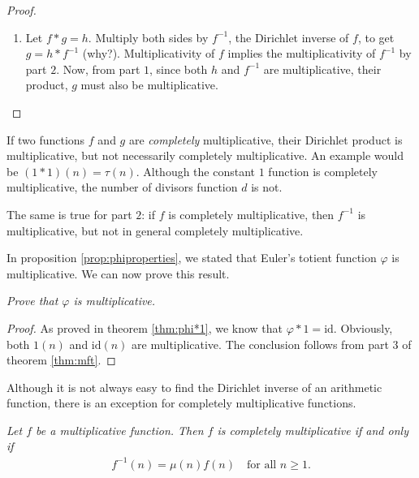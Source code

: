 \documentclass[12pt]{subfile}
\begin{document}
\begin{proof}
\begin{enumerate}
				\item Let $f\ast g=h$. Multiply both sides by $f^{-1}$, the Dirichlet inverse of $f$, to get $g = h \ast f^{-1}$ (why?). Multiplicativity of $f$ implies the multiplicativity of $f^{-1}$ by part $2$. Now, from part $1$, since both $h$ and $f^{-1}$ are multiplicative, their product, $g$ must also be multiplicative.
			\end{enumerate}
		\end{proof}
		
		\begin{note}
			If two functions $f$ and $g$ are \textit{completely} multiplicative, their Dirichlet product is multiplicative, but not necessarily completely multiplicative. An example would be $(1 \ast 1)(n) = \tau(n)$. Although the constant $1$ function is completely multiplicative, the number of divisors function $d$ is not.
			
			The same is true for part $2$: if $f$ is completely multiplicative, then $f^{-1}$ is multiplicative, but not in general completely multiplicative.
		\end{note}
	
	In proposition \eqref{prop:phiproperties}, we stated that Euler's totient function $\varphi$ is multiplicative. We can now prove this result.
	
		\begin{proposition}\slshape\label{prop:multiplicativephi}
			Prove that $\varphi$ is multiplicative.
		\end{proposition}
		
		\begin{proof}
			As proved in theorem \eqref{thm:phi*1}, we know that $\varphi \ast 1 = \text{id}$. Obviously, both $1(n)$ and $\text{id}(n)$ are multiplicative. The conclusion follows from part $3$ of theorem \eqref{thm:mft}.
		\end{proof}
		
		
Although it is not always easy to find the Dirichlet inverse of an arithmetic function, there is an exception for completely multiplicative functions.

		\begin{theorem}\slshape\label{thm:completelymultiplicative}
			Let $f$ be a multiplicative function. Then $f$ is completely multiplicative if and only if
				\begin{align*}
					f^{-1}(n) = \mu(n) f(n) \quad \text{for all } n \geq 1.
				\end{align*}
		\end{theorem}
		
\end{document}
